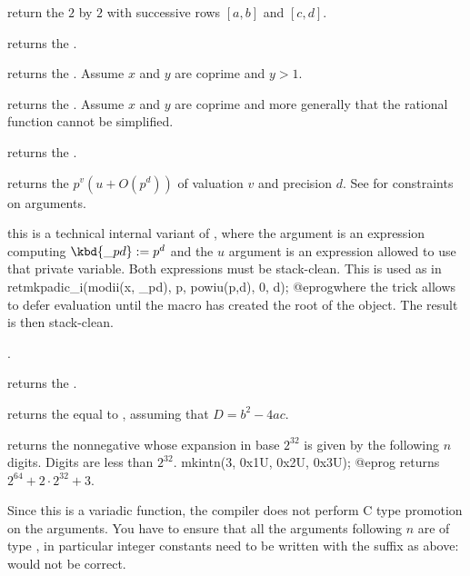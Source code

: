  return the $2$ by $2$
 with successive rows $[a,b]$ and $[c,d]$.

returns the  .

returns the  . Assume $x$ and $y$ are coprime and $y > 1$.

returns the  . Assume $x$ and $y$ are coprime and more
generally that the rational function cannot be simplified.

returns the  .

 returns the
 $p^v(u + O(p^d))$ of valuation $v$ and precision $d$. See
 for constraints on arguments.

 this is a
technical internal variant of , where the  argument is
an expression computing $\kbd{\_pd} := p^d$ and the $u$ argument is
an expression allowed to use that private  variable. Both
expressions must be stack-clean. This is used as in
\bprog
  retmkpadic_i(modii(x, _pd), p, powiu(p,d), 0, d);
@eprog\noindent where the  trick allows to defer evaluation until
the macro has created the  root of the object. The result is then
stack-clean.

.

returns the  .

 returns the  equal
to , assuming that $D = b^2 - 4ac$.

\smallskip

 returns the nonnegative  whose
expansion in base $2^{32}$ is given by the following $n$ digits. Digits
are  less than $2^{32}$.
\bprog
  mkintn(3, 0x1U, 0x2U, 0x3U);
@eprog
\noindent returns $2^{64} + 2 \cdot 2^{32} + 3$.

 Since this is a variadic function, the compiler does
not perform C type promotion on the arguments. You have to ensure that all
the arguments following $n$ are of type , in particular
integer constants need to be written with the  suffix as above:
 would not be correct.

